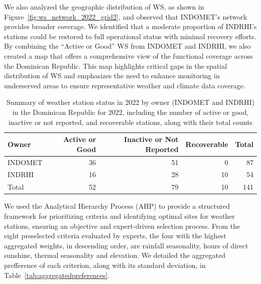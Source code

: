 \documentclass[spanish]{article}
\begin{document}
We also analyzed the geographic distribution of WS, as shown in
Figure~\ref{fig:ws_network_2022_grid2}, and observed that INDOMET's
network provides broader coverage. We identified that a moderate
proportion of INDRHI's stations could be restored to full operational
status with minimal recovery efforts. By combining the ``Active or
Good'' WS from INDOMET and INDRHI, we also created a map that offers a
comprehensive view of the functional coverage across the Dominican
Republic. This map highlights critical gaps in the spatial distribution
of WS and emphasizes the need to enhance monitoring in underserved areas
to ensure representative weather and climate data coverage.

\begin{table}

\caption{\label{tab:summaryindometindrhi}Summary of weather station status in 2022 by owner (INDOMET and INDRHI) in the Dominican Republic for 2022, including the number of active or good, inactive or not reported, and recoverable stations, along with their total counts}
\centering
\begin{tabular}[t]{lrrrr}
\toprule
\textbf{Owner} & \textbf{Active or Good} & \textbf{Inactive or Not Reported} & \textbf{Recoverable} & \textbf{Total}\\
\midrule
INDOMET & 36 & 51 & 0 & 87\\
INDRHI & 16 & 28 & 10 & 54\\
Total & 52 & 79 & 10 & 141\\
\bottomrule
\end{tabular}
\end{table}

We used the Analytical Hierarchy Process (AHP) to provide a structured
framework for prioritizing criteria and identifying optimal sites for
weather stations, ensuring an objective and expert-driven selection
process. From the eight preselected criteria evaluated by experts, the
four with the highest aggregated weights, in descending order, are
rainfall seasonality, hours of direct sunshine, thermal seasonality and
elevation. We detailed the aggregated prefference of each criterion,
along with its standard deviation, in
Table~\ref{tab:aggregatedpreferences}.
\end{document}

